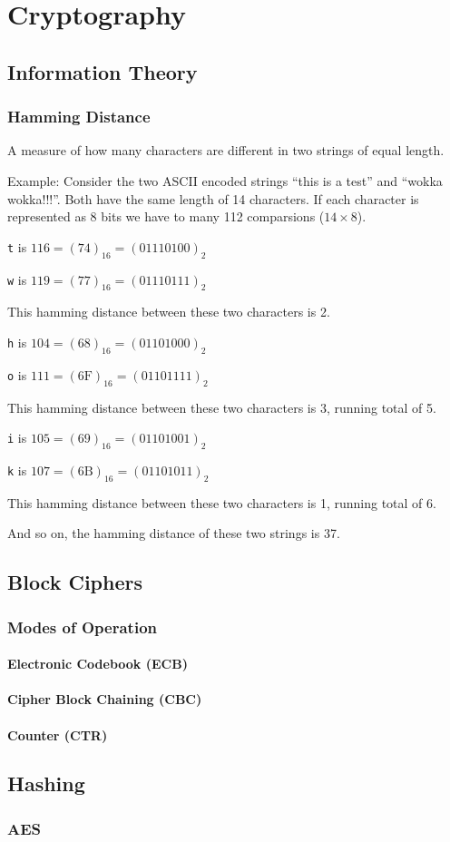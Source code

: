 \chapter{Cryptography}

\section{Information Theory}

\subsection{Hamming Distance}

A measure of how many characters are different in two strings of equal length.

Example: Consider the two ASCII encoded strings ``this is a test'' and ``wokka
wokka!!!''. Both have the same length of 14 characters. If each character is
represented as 8 bits we have to many 112 comparsions ($14 \times 8$).

\texttt{t} is $116 = (74)_{16} = (01110100)_{2}$

\texttt{w} is $119 = (77)_{16} = (01110111)_{2}$

This hamming distance between these two characters is 2.

\texttt{h} is $104 = (68)_{16} = (01101000)_{2}$

\texttt{o} is $111 = (6\text{F})_{16} = (01101111)_{2}$

This hamming distance between these two characters is 3, running total of 5.

\texttt{i} is $105 = (69)_{16} = (01101001)_{2}$

\texttt{k} is $107 = (6\text{B})_{16} = (01101011)_{2}$

This hamming distance between these two characters is 1, running total of 6.

And so on, the hamming distance of these two strings is 37.

\section{Block Ciphers}

\subsection{Modes of Operation}

\subsubsection{Electronic Codebook (ECB)}

\subsubsection{Cipher Block Chaining (CBC)}

\subsubsection{Counter (CTR)}

\section{Hashing}

\subsection{AES}
